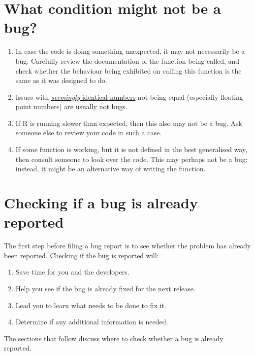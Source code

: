 \documentclass[
]{book}
\begin{document}
\section{What condition might not be a bug?}\label{what-condition-might-not-be-a-bug}

\begin{enumerate}
\def\labelenumi{\arabic{enumi}.}
\item
  In case the code is doing something unexpected, it may not necessarily be a bug. Carefully review the documentation of the function being called, and check whether the behaviour being exhibited on calling this function is the same as it was designed to do.
\item
  Issues with \href{https://cran.r-project.org/doc/FAQ/R-FAQ.html\#Why-doesn_0027t-R-think-these-numbers-are-equal_003f}{\emph{seemingly} identical numbers} not being equal (especially floating point numbers) are usually not bugs.
\item
  If R is running slower than expected, then this also may not be a bug. Ask someone else to review your code in such a case.
\item
  If some function is working, but it is not defined in the best generalised way, then consult someone to look over the code. This may perhaps not be a bug; instead, it might be an alternative way of writing the function.
\end{enumerate}

\section{Checking if a bug is already reported}\label{checking-if-a-bug-is-already-reported}

The first step before filing a bug report is to see whether the problem has already been reported. Checking if the bug is reported will:

\begin{enumerate}
\def\labelenumi{\arabic{enumi}.}
\item
  Save time for you and the developers.
\item
  Help you see if the bug is already fixed for the next release.
\item
  Lead you to learn what needs to be done to fix it.
\item
  Determine if any additional information is needed.
\end{enumerate}

The sections that follow discuss where to check whether a bug is already reported.
\end{document}
